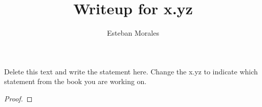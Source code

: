 \documentclass[12pt]{article}
\newenvironment{statement}[2][Section]{\begin{trivlist}
\item[\hskip \labelsep {\bfseries #1}\hskip \labelsep {\bfseries #2.}]}{\end{trivlist}}
\begin{document}
 
%
%
 
\title{Writeup for x.yz} %
\author{Esteban Morales} %
\maketitle


\begin{statement}{x.yz} %
Delete this text and write the statement here. Change the x.yz to indicate which statement from the book you are working on.
\end{statement}
 
\begin{proof}  





\end{proof}
 








 
\end{document}
